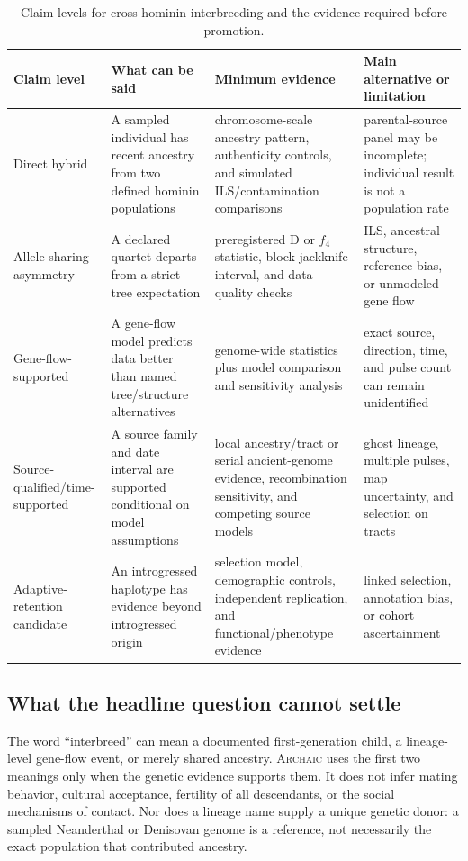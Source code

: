 \documentclass[conference]{IEEEtran}
\newcommand{\archaic}{\textsc{Archaic}}
\begin{document}
\begin{table}[t]
\caption{Claim levels for cross-hominin interbreeding and the evidence required before promotion.}
\label{tab:claims}
\centering
\footnotesize
\begin{tabular}{L{0.18\textwidth} L{0.25\textwidth} L{0.28\textwidth} L{0.20\textwidth}}
\toprule
Claim level & What can be said & Minimum evidence & Main alternative or limitation \\
\midrule
Direct hybrid & A sampled individual has recent ancestry from two defined hominin populations & chromosome-scale ancestry pattern, authenticity controls, and simulated ILS/contamination comparisons & parental-source panel may be incomplete; individual result is not a population rate \\
Allele-sharing asymmetry & A declared quartet departs from a strict tree expectation & preregistered D or $f_4$ statistic, block-jackknife interval, and data-quality checks & ILS, ancestral structure, reference bias, or unmodeled gene flow \\
Gene-flow-supported & A gene-flow model predicts data better than named tree/structure alternatives & genome-wide statistics plus model comparison and sensitivity analysis & exact source, direction, time, and pulse count can remain unidentified \\
Source-qualified/time-supported & A source family and date interval are supported conditional on model assumptions & local ancestry/tract or serial ancient-genome evidence, recombination sensitivity, and competing source models & ghost lineage, multiple pulses, map uncertainty, and selection on tracts \\
Adaptive-retention candidate & An introgressed haplotype has evidence beyond introgressed origin & selection model, demographic controls, independent replication, and functional/phenotype evidence & linked selection, annotation bias, or cohort ascertainment \\
\bottomrule
\end{tabular}
\end{table}

\subsection{What the headline question cannot settle}

The word ``interbreed'' can mean a documented first-generation child, a lineage-level gene-flow event, or merely shared ancestry. \archaic{} uses the first two meanings only when the genetic evidence supports them. It does not infer mating behavior, cultural acceptance, fertility of all descendants, or the social mechanisms of contact. Nor does a lineage name supply a unique genetic donor: a sampled Neanderthal or Denisovan genome is a reference, not necessarily the exact population that contributed ancestry.
\end{document}

